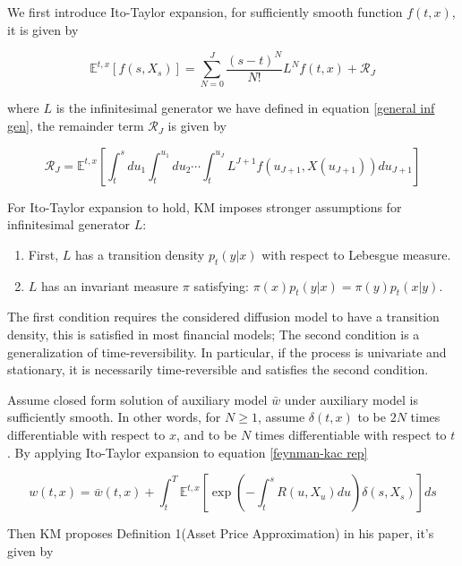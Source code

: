 We first introduce Ito-Taylor expansion, for sufficiently smooth function $f(t,x)$, it is given by

\begin{equation}
    \mathbb{E}^{t, x}[f(s, X_s)]=\sum_{N=0}^{J} \frac{(s-t)^{N}}{N !}L^N f(t, x)+\mathcal{R}_{J}
\end{equation}

\noindent where $L$ is the infinitesimal generator we have defined in equation \eqref{general inf gen}, the remainder term $\mathcal{R}_{J}$ is given by

\begin{equation}
    \mathcal{R}_{J}=\mathbb{E}^{t, x}\left[\int_{t}^{s} d u_{1} \int_{t}^{u_{1}} d u_{2} \cdots \int_{t}^{u_{J}}L^{J+1} f\left(u_{J+1}, X\left(u_{J+1}\right)\right) d u_{J+1}\right]
\end{equation}

For Ito-Taylor expansion to hold, KM imposes stronger assumptions for infinitesimal generator $L$:

\begin{enumerate}
    \item First, $L$ has a transition density $p_t(y|x)$ with respect to Lebesgue measure.
    \item $L$ has an invariant measure $\pi$ satisfying: $\pi(x)p_t(y|x) = \pi(y)p_t(x|y)$.
\end{enumerate}

\noindent The first condition requires the considered diffusion model to have a transition density, this is satisfied in most financial models; The second condition is a generalization of time-reversibility. In particular, if the process is univariate and stationary, it is necessarily time-reversible and satisfies the second condition.

Assume closed form solution of auxiliary model $\bar{w}$ under auxiliary model is sufficiently smooth. In other words, for $N \geq 1$, assume $\delta(t,x)$ to be $2N$ times differentiable with respect to $x$, and to be $N$ times differentiable with respect to $t$. By applying Ito-Taylor expansion to equation \eqref{feynman-kac rep}

\begin{equation}
    w(t, x)=\bar{w}(t,x)+\int_{t}^{T} \mathbb{E}^{t,x}\left[\exp \left(-\int_{t}^{s} R(u, X_u) d u\right) \delta(s,X_s)\right] d s
\end{equation}

\noindent Then KM proposes Definition 1(Asset Price Approximation) in his paper, it's given by


